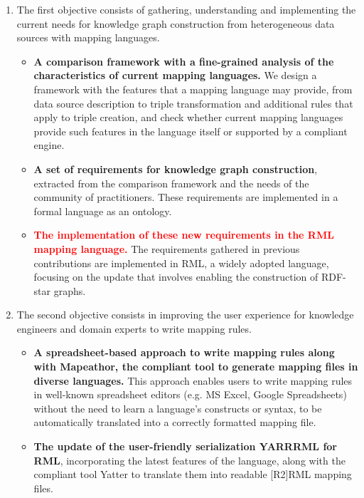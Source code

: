 \begin{enumerate}
    \item The first objective consists of gathering, understanding and implementing the current needs for knowledge graph construction from heterogeneous data sources with mapping languages. 

    \begin{itemize}
        \item \textbf{A comparison framework with a fine-grained analysis of the characteristics of current mapping languages.} We design a framework with the features that a mapping language may provide, from data source description to triple transformation and additional rules that apply to triple creation, and check whether current mapping languages provide such features in the language itself or supported by a compliant engine. 

        \item \textbf{A set of requirements for knowledge graph construction}, extracted from the comparison framework and the needs of the community of practitioners. These requirements are implemented in a formal language as an ontology. 

        \item \textcolor{red}{\textbf{The implementation of these new requirements in the RML mapping language.}} The requirements gathered in previous contributions are implemented in RML, a widely adopted language, focusing on the update that involves enabling the construction of RDF-star graphs.
    \end{itemize}

    \item The second objective consists in improving the user experience for knowledge engineers and domain experts to write mapping rules.

    \begin{itemize}
        \item \textbf{A spreadsheet-based approach to write mapping rules along with Mapeathor, the compliant tool to generate mapping files in diverse languages.} This approach enables users to write mapping rules in well-known spreadsheet editors (e.g. MS Excel, Google Spreadsheets) without the need to learn a language's constructs or syntax, to be automatically translated into a correctly formatted mapping file. 

        \item \textbf{The update of the user-friendly serialization YARRRML for RML}, incorporating the latest features of the language, along with the compliant tool Yatter to translate them into readable [R2]RML mapping files. 
    \end{itemize}


\end{enumerate}
